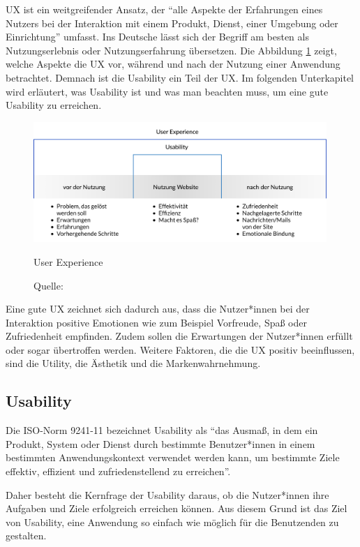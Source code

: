  \ac{UX} ist ein weitgreifender Ansatz, der \enquote{alle Aspekte der Erfahrungen eines Nutzers bei der Interaktion mit einem Produkt, Dienst, einer Umgebung oder Einrichtung} umfasst.
Ins Deutsche lässt sich der Begriff am besten als Nutzungserlebnis oder Nutzungserfahrung übersetzen. \citep[vgl.]{jacobsen_praxisbuch_2019}
Die Abbildung \ref{fig:abb2} zeigt, welche Aspekte die \ac{UX} vor, während und nach der Nutzung einer Anwendung betrachtet.
Demnach ist die Usability ein Teil der \ac{UX}.
Im folgenden Unterkapitel wird erläutert, was Usability ist und was man beachten muss, um eine gute Usability zu erreichen.

\begin{figure}[h]
	\centering
    	\includegraphics[width=0.99\textwidth]{Images/User_Experience.png}
   	\caption{User Experience}
	\caption*{\small Quelle: \cite{jacobsen_praxisbuch_2019}}
   	\label{fig:abb2}
\end{figure}

Eine gute \ac{UX} zeichnet sich dadurch aus, dass die Nutzer*innen bei der Interaktion positive Emotionen wie zum Beispiel Vorfreude, Spaß oder Zufriedenheit empfinden.
Zudem sollen die Erwartungen der Nutzer*innen erfüllt oder sogar übertroffen werden.
Weitere Faktoren, die die \ac{UX} positiv beeinflussen, sind die Utility, die Ästhetik und die Markenwahrnehmung. \citep[vgl.]{weichert_quick_2021}

\subsection{Usability}

Die ISO-Norm 9241-11 \citep{ISO_standard} bezeichnet Usability als \enquote{das Ausmaß, in dem ein Produkt, System oder Dienst durch bestimmte Benutzer*innen in einem bestimmten Anwendungskontext verwendet werden kann, um bestimmte Ziele effektiv, effizient und zufriedenstellend zu erreichen}.

Daher besteht die Kernfrage der Usability daraus, ob die Nutzer*innen ihre Aufgaben und Ziele erfolgreich erreichen können.
Aus diesem Grund ist das Ziel von Usability, eine Anwendung so einfach wie möglich für die Benutzenden zu gestalten. \citep[vgl.]{jacobsen_praxisbuch_2019}

